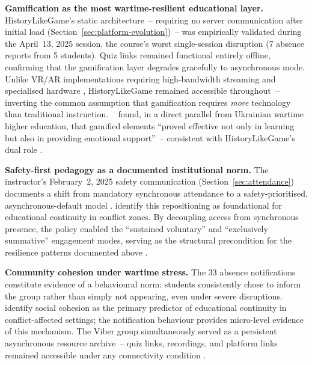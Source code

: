 \textbf{Gamification as the most wartime-resilient educational layer.} HistoryLikeGame's static architecture~-- requiring no server communication after initial load (Section~\ref{sec:platform-evolution})~-- was empirically validated during the April~13, 2025 session, the course's worst single-session disruption (7 absence reports from 5 students). Quiz links remained functional entirely offline, confirming that the gamification layer degrades gracefully to asynchronous mode. Unlike VR/AR implementations requiring high-bandwidth streaming and specialised hardware \cite{KorniienkoSemerikov2024, 13Humpire2022, 15Slater2022}, HistoryLikeGame remained accessible throughout~-- inverting the common assumption that gamification requires \emph{more} technology than traditional instruction. \citeauthor{Zhumbei2025}~\cite{Zhumbei2025} found, in a direct parallel from Ukrainian wartime higher education, that gamified elements ``proved effective not only in learning but also in providing emotional support''~-- consistent with HistoryLikeGame's dual role \cite{Vovchasta2024}.

\textbf{Safety-first pedagogy as a documented institutional norm.} The instructor's February~2, 2025 safety communication (Section~\ref{sec:attendance}) documents a shift from mandatory synchronous attendance \cite{MON} to a safety-prioritised, asynchronous-default model \cite{UNESCO2023}. \cite{Burde2017} identify this repositioning as foundational for educational continuity in conflict zones. By decoupling access from synchronous presence, the policy enabled the ``sustained voluntary'' and ``exclusively summative'' engagement modes, serving as the structural precondition for the resilience patterns documented above \cite{Ovcharuk2023}.

\textbf{Community cohesion under wartime stress.} The 33 absence notifications constitute evidence of a behavioural norm: students consistently chose to inform the group rather than simply not appearing, even under severe disruptions. \cite{Burde2017} identify social cohesion as the primary predictor of educational continuity in conflict-affected settings; the notification behaviour provides micro-level evidence of this mechanism. The Viber group simultaneously served as a persistent asynchronous resource archive~-- quiz links, recordings, and platform links remained accessible under any connectivity condition \cite{Sailer2017, Hlianenko2024}.

